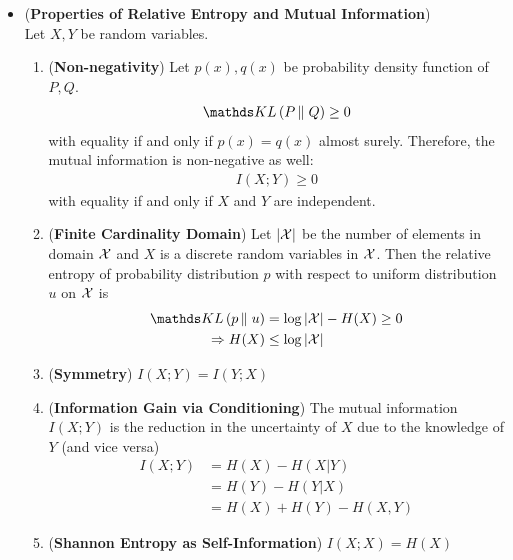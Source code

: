 \documentclass[11pt]{article}
\begin{document}
\begin{itemize}
\item \begin{proposition} (\textbf{Properties of Relative Entropy and Mutual Information})  \citep{thomas2006elements}\\
Let $X, Y$ be random variables.
\begin{enumerate}
\item (\textbf{Non-negativity})  Let $p(x), q(x)$ be probability density function of $P ,Q$.
\begin{align*}
\kl{P}{Q} \ge 0
\end{align*} with equality if and only if $p(x) = q(x)$ almost surely. Therefore, the mutual information is non-negative as well:
\begin{align*}
I(X; Y) \ge 0
\end{align*} with equality if and only if $X$ and $Y$ are independent.
\item (\textbf{Finite Cardinality Domain}) Let $\left\lvert {\mathcal X} \right\rvert$ be the number of elements in domain ${\mathcal X}$ and $X$ is a discrete random variables in ${\mathcal X}$. Then the relative entropy of probability distribution $p$ with respect to uniform distribution $u$ on ${\mathcal X}$ is 
\begin{align*}
\kl{p}{u}  &= \log \abs{\cX} - H(X) \ge 0\\
\Rightarrow H(X) &\le \log \abs{\cX}
\end{align*}
\item (\textbf{Symmetry})  $I(X; Y) = I(Y; X)$
\item (\textbf{Information Gain via Conditioning}) The mutual information $I(X; Y)$ is the reduction in the uncertainty of $X$ due to the knowledge of $Y$ (and vice versa)
\begin{align}
I(X; Y) &= H(X) - H(X | Y) \label{eqn: mutual_information_gain}\\
&= H(Y) - H(Y | X) \nonumber\\
&= H(X) + H(Y) - H(X, Y) \nonumber
\end{align}
\item (\textbf{Shannon Entropy as Self-Information})  $I(X; X) = H(X)$
\end{enumerate}
\end{proposition}
\end{itemize}
\end{document}

